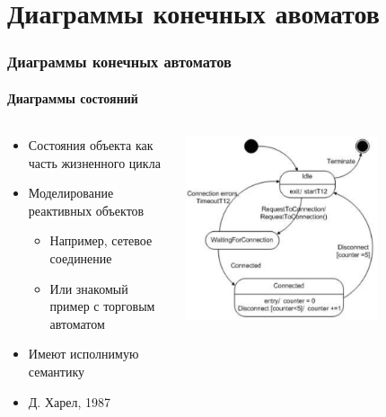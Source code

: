 \documentclass[xetex,mathserif,serif]{beamer}
\begin{document}
	\section{Диаграммы конечных авоматов}

	\begin{frame}
		\frametitle{Диаграммы конечных автоматов}
		\framesubtitle{Диаграммы состояний}
		\begin{columns}
			\begin{column}{0.5\textwidth}
				\begin{itemize}
					\item Состояния объекта как часть жизненного цикла
					\item Моделирование реактивных объектов
					\begin{itemize}
						\item Например, сетевое соединение
						\item Или знакомый пример с торговым автоматом
					\end{itemize}
					\item Имеют исполнимую семантику
					\item Д. Харел, 1987
				\end{itemize}
			\end{column}
			\begin{column}{0.5\textwidth}
				\begin{center}
					\includegraphics[width=0.7\textwidth]{stateTransitionExample.png}
				\end{center}
			\end{column}
		\end{columns}
	\end{frame}
\end{document}

